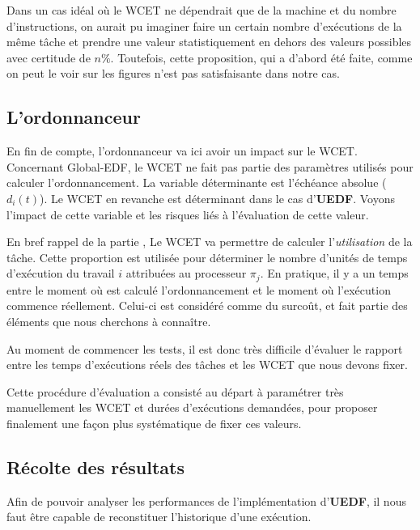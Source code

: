 	Dans un cas idéal où le WCET ne dépendrait que de la machine et du nombre d'instructions, 
	on aurait pu imaginer faire un certain nombre d'exécutions de la même tâche et prendre une valeur 
	statistiquement en dehors des valeurs possibles avec certitude de $n\%$. 
	Toutefois, cette proposition, qui a d'abord été faite, comme on peut le voir sur les figures 
	n'est pas satisfaisante dans notre cas.

	\subsection{L'ordonnanceur}
	
	En fin de compte, l'ordonnanceur va ici avoir un impact sur le WCET. 
	Concernant Global-EDF, le WCET ne fait pas partie des paramètres utilisés pour calculer 
	l'ordonnancement. La variable déterminante est l'échéance absolue ($d_i(t)$). 
	Le WCET en revanche est déterminant dans le cas d'\textbf{UEDF}. Voyons 
	l'impact de cette variable et les risques liés à l'évaluation de cette valeur.\newline
	
	En bref rappel de la partie , 
	Le WCET va permettre de calculer l'\textit{utilisation} de la tâche. 
	Cette proportion est utilisée pour déterminer le nombre d'unités de temps d'exécution 
	du travail $i$ attribuées au processeur $\pi_j$. \newline
	En pratique, il y a un temps entre le moment où est calculé l'ordonnancement et le 
	moment où l'exécution commence réellement. Celui-ci est considéré comme du surcoût, et 
	fait partie des éléments que nous cherchons à connaître. \newline
	
	Au moment de commencer les tests, il est donc très difficile d'évaluer le rapport 
	entre les temps d'exécutions réels des tâches et les WCET que nous devons fixer. \newline
	
	Cette procédure d'évaluation a consisté au départ à paramétrer très manuellement les WCET et 
	durées d'exécutions demandées, pour proposer finalement une façon plus systématique 
	de fixer ces valeurs.

		
\subsection{Récolte des résultats}
	Afin de pouvoir analyser les performances de l'implémentation d'\textbf{UEDF}, il nous faut être capable de reconstituer 
	l'historique d'une exécution. \newline
	
